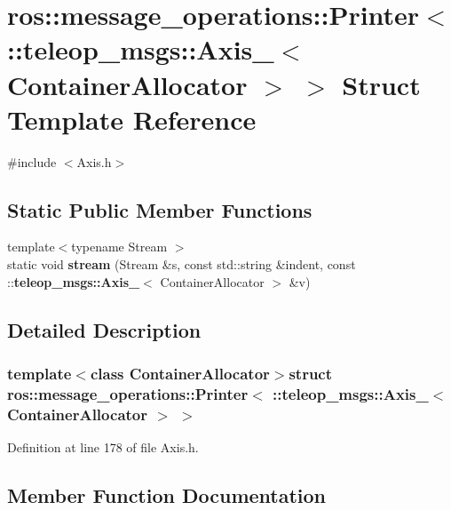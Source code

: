 \section{ros::message\_\-operations::Printer$<$ ::teleop\_\-msgs::Axis\_\-$<$ ContainerAllocator $>$ $>$ Struct Template Reference}
\label{structros_1_1message__operations_1_1Printer_3_01_1_1teleop__msgs_1_1Axis___3_01ContainerAllocator_01_4_01_4}


{\ttfamily \#include $<$Axis.h$>$}

\subsection*{Static Public Member Functions}
\begin{DoxyCompactItemize}
\item 
{\footnotesize template$<$typename Stream $>$ }\\static void {\bf stream} (Stream \&s, const std::string \&indent, const ::{\bf teleop\_\-msgs::Axis\_\-}$<$ ContainerAllocator $>$ \&v)
\end{DoxyCompactItemize}


\subsection{Detailed Description}
\subsubsection*{template$<$class ContainerAllocator$>$struct ros::message\_\-operations::Printer$<$ ::teleop\_\-msgs::Axis\_\-$<$ ContainerAllocator $>$ $>$}



Definition at line 178 of file Axis.h.



\subsection{Member Function Documentation}

